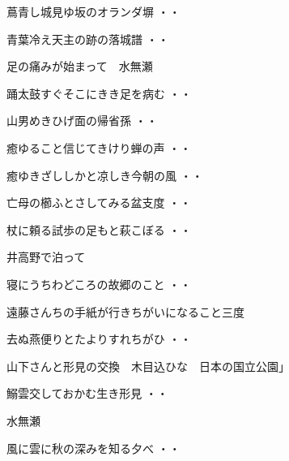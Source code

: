 \begin{shiika}蔦青し城見ゆ坂のオランダ塀
\hfill{・・}\end{shiika}
\begin{shiika}青葉冷え天主の跡の落城譜
\hfill{・・}\end{shiika}
\vspace{0.6cm}
足の痛みが始まって　水無瀬
\begin{shiika}踊太鼓すぐそこにきき足を病む
\hfill{・・}\end{shiika}
\begin{shiika}山男めきひげ面の帰省孫
\hfill{・・}\end{shiika}
\begin{shiika}癒ゆること信じてきけり蝉の声
\hfill{・・}\end{shiika}
\begin{shiika}癒ゆきざししかと凉しき今朝の風
\hfill{・・}\end{shiika}
\begin{shiika}亡母の櫛ふとさしてみる盆支度
\hfill{・・}\end{shiika}
\begin{shiika}杖に頼る試歩の足もと萩こぼる
\hfill{・・}\end{shiika}
\vspace{0.6cm}
井高野で泊って
\begin{shiika}寝にうちわどころの故郷のこと
\hfill{・・}\end{shiika}
\vspace{0.6cm}
遠藤さんちの手紙が行きちがいになること三度
\begin{shiika}去ぬ燕便りとたよりすれちがひ
\hfill{・・}\end{shiika}
\vspace{0.6cm}
山下さんと形見の交換　木目込ひな　日本の国立公園」
\begin{shiika}鰯雲交しておかむ生き形見
\hfill{・・}\end{shiika}
\vspace{0.6cm}
水無瀬
\begin{shiika}風に雲に秋の深みを知る夕べ
\hfill{・・}\end{shiika}
